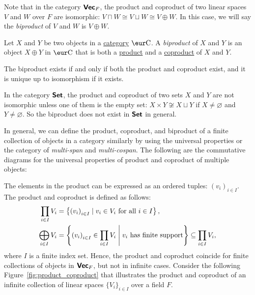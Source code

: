 Note that in the category $\operatorname{\text{\normalfont\bf\sffamily Vec}}_F$, the product and coproduct of two linear spaces $V$ and $W$ over $F$ are isomorphic: $V \sqcap W \cong V \sqcup W \cong V \oplus W$. In this case, we will say the \emph{biproduct} of $V$ and $W$ is $V \oplus W$.

\begin{definition}[Biproduct]\label{def:biproduct}
  Let $X$ and $Y$ be two objects in a \hyperref[def:category]{category} $\Ca$. A \emph{biproduct} of $X$ and $Y$ is an object $X \oplus Y$ in $\Ca$ that is both a \hyperref[def:product]{product} and a \hyperref[def:coproduct]{coproduct} of $X$ and $Y$.
\end{definition}

\begin{remark}
  The biproduct exists if and only if both the product and coproduct exist, and it is unique up to isomorphism if it exists.
\end{remark}

\begin{example}
  In the category $\operatorname{\text{\normalfont\bf\sffamily Set}}$, the product and coproduct of two sets $X$ and $Y$ are not isomorphic unless one of them is the empty set: $X \times Y \not\cong X \sqcup Y$ if $X \neq \varnothing$ and $Y \neq \varnothing$. So the biproduct does not exist in $\operatorname{\text{\normalfont\bf\sffamily Set}}$ in general.
\end{example}

In general, we can define the product, coproduct, and biproduct of a finite collection of objects in a category similarly by using the universal properties or the category of \emph{multi-span} and \emph{multi-cospan}. The following are the commutative diagrams for the universal properties of product and coproduct of multiple objects:
\begin{center}
  \qquad
\end{center}

The elements in the product can be expressed as an ordered tuples: ${(v_i)}_{i \in I}$. The product and coproduct is defined as follows:
\begin{align*}
  \prod_{i \in I} V_i     & = \left\{ {(v_i)}_{i \in I} \mid v_i \in V_i \text{ for all } i \in I \right\},                                                    \\
  \bigoplus_{i \in I} V_i & = \left\{ {(v_i)}_{i \in I} \in \prod_{i \in I} V_i \Biggm| v_i \text{ has finite support} \right\} \subseteq \prod_{i \in I} V_i,
\end{align*}
where $I$ is a finite index set. Hence, the product and coproduct coincide for finite collections of objects in $\operatorname{\text{\normalfont\bf\sffamily Vec}}_F$, but not in infinite cases. Consider the following Figure~\ref{fig:product_coproduct} that illustrates the product and coproduct of an infinite collection of linear spaces ${\{ V_i \}}_{i \in I}$ over a field $F$.

